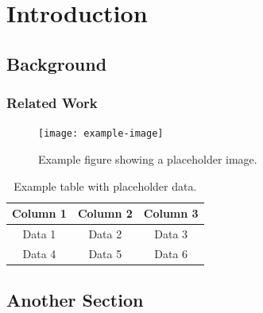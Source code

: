 \documentclass[12pt, twoside]{article}
\begin{document}

\clearpage
\thispagestyle{empty}

\setcounter{page}{1}
\tableofcontents
\clearpage

\listoffigures
\clearpage

\listoftables
\clearpage

\section{Introduction}
\lipsum[1] %

\subsection{Background}
\lipsum[2] %

\subsubsection{Related Work}
\lipsum[3] %

\begin{figure}[H]
    \centering
    \texttt{[image: example-image]} %
    \caption{Example figure showing a placeholder image.}
    \label{fig:example}
\end{figure}

\begin{table}[H]
    \centering
    \begin{tabular}{|c|c|c|}
        \hline
        Column 1 & Column 2 & Column 3 \\ \hline
        Data 1   & Data 2   & Data 3   \\ \hline
        Data 4   & Data 5   & Data 6   \\ \hline
    \end{tabular}
    \caption{Example table with placeholder data.}
    \label{tab:example}
\end{table}

\subsection{Another Section}
\lipsum[4-5] %
\end{document}
